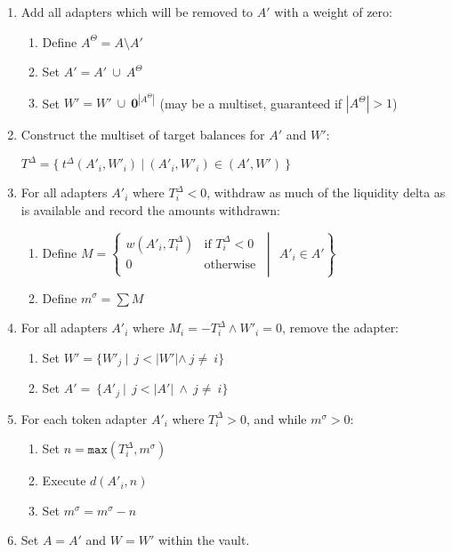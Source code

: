 \documentclass{article}
\begin{document}
\begin{enumerate}
    \item Add all adapters which will be removed to $A'$ with a weight of zero:
    
    \begin{enumerate}
        \item Define $A^{\Theta} = A \setminus A'$
        \item Set $A' = A'~\cup~A^\Theta$
        \item Set $W' = W'~\cup~\textbf{0}^{|A^\Theta|}$ (may be a multiset, guaranteed if $|A^\Theta| > 1$)
    \end{enumerate}

    \item Construct the multiset of target balances for $A'$ and $W'$:
    
    $T^{\Delta} = \{~t^{\Delta}(A'_i, W'_i)~|~(A'_i, W'_i) \in (A', W')~\}$
    
    \item For all adapters $A'_{i}$ where $T^{\Delta}_i < 0$, withdraw as much of the liquidity delta as is available and record the amounts withdrawn:
    \begin{enumerate}
        \item
        Define $M = \left.\begin{cases}w(A'_i, T^{\Delta}_i) & \text{if } T^{\Delta}_i<0\\
                0 & \text{otherwise}\\\end{cases}\ \middle|\ ~A'_i\in A'\right\}$
        
        \item Define $m^{\sigma} = \sum{M}$
    \end{enumerate}

    \item For all adapters $A'_i$ where $M_i = - T^{\Delta}_i \wedge W'_i = 0$, remove the adapter:
    \begin{enumerate}
        \item Set $W' = \{W'_j \ |\ ~j<|W'|\wedge~j\neq~i\}$
        \item Set $A' =~\{A'_j \ |\ ~j<|A'|~\wedge~j\neq~i\}$
    \end{enumerate}
    
    \item For each token adapter $A'_i$ where $T^\Delta_i > 0$, and while $m^\sigma > 0$:
    
    \begin{enumerate}
        \item Set $n = \texttt{max}(T^\Delta_i, m^\sigma)$
        \item Execute $d(A'_i, n)$
        \item Set $m^\sigma = m^\sigma - n$
    \end{enumerate}
    
    \item Set $A = A'$ and $W = W'$ within the vault.
\end{enumerate}
\end{document}
